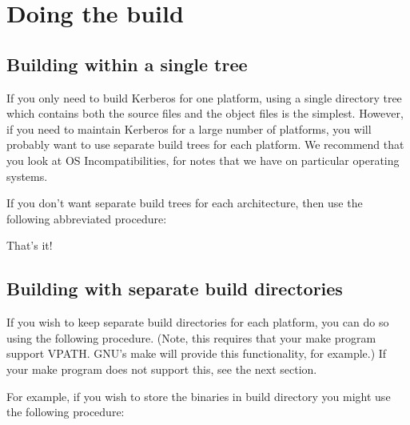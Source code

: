 \documentclass[letterpaper,10pt,english]{sphinxmanual}
\begin{document}
\sphinxstepscope


\section{Doing the build}
\label{\detokenize{build/doing_build:doing-the-build}}\label{\detokenize{build/doing_build::doc}}

\subsection{Building within a single tree}
\label{\detokenize{build/doing_build:building-within-a-single-tree}}\label{\detokenize{build/doing_build:do-build}}
\sphinxAtStartPar
If you only need to build Kerberos for one platform, using a single
directory tree which contains both the source files and the object
files is the simplest.  However, if you need to maintain Kerberos for
a large number of platforms, you will probably want to use separate
build trees for each platform.  We recommend that you look at OS
Incompatibilities, for notes that we have on particular operating
systems.

\sphinxAtStartPar
If you don’t want separate build trees for each architecture, then use
the following abbreviated procedure:

\begin{sphinxVerbatim}[commandchars=\\\{\}]
 
\end{sphinxVerbatim}

\sphinxAtStartPar
That’s it!


\subsection{Building with separate build directories}
\label{\detokenize{build/doing_build:building-with-separate-build-directories}}
\sphinxAtStartPar
If you wish to keep separate build directories for each platform, you
can do so using the following procedure.  (Note, this requires that
your make program support VPATH.  GNU’s make will provide this
functionality, for example.)  If your make program does not support
this, see the next section.

\sphinxAtStartPar
For example, if you wish to store the binaries in  build
directory you might use the following procedure:
\end{document}
